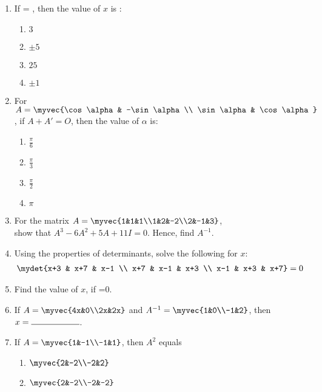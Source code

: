 \begin{enumerate}
\item If  = , then the value of $x$ is :
	\begin{enumerate}
		\item $3$
		\item $\pm5$
		\item $25$
		\item $\pm1$
	\end{enumerate}
\item For $A= \myvec{\cos\alpha & -\sin\alpha \\ \sin\alpha & \cos\alpha}$, if $A + A' = O$, then the value of $\alpha$ is:
	\begin{enumerate}
		\item $\frac{\pi}{6}$
		\item $\frac{\pi}{3}$
		\item $\frac{\pi}{2}$
		\item $\pi$
	\end{enumerate}
\item For the matrix $A = \myvec{1&1&1\\1&2&-2\\2&-1&3}$, \\show that $A^3 -6A^2 + 5A +11I = 0$. Hence, find $A^{-1}$.
\item Using the properties of determinants, solve the following for $x$: 
	\begin{align}
		\mydet{x+3 & x+7 & x-1 \\ x+7 & x-1 & x+3 \\ x-1 & x+3 & x+7} = 0
	\end{align}
\item Find the value of $x$, if =0.
\item If $A= \myvec{4x&0\\2x&2x}$ and $A^{-1}=\myvec{1&0\\-1&2}$, then $x= \rule{2cm}{0.15mm}$.
\item If $A=\myvec{1&-1\\-1&1}$, then $A^2$ equals 
	\begin{enumerate}
		\item $\myvec{2&-2\\-2&2}$
		\item $\myvec{2&-2\\-2&-2}$

\end{enumerate}
\end{enumerate}
